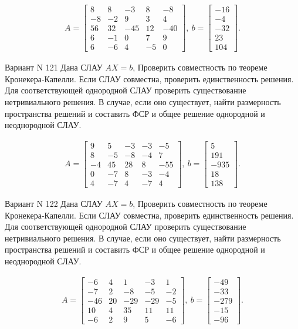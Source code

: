 \documentclass[11pt]{report}
\begin{document}
\begin{align*}
 A = \left[\begin{matrix}8 & 8 & -3 & 8 & -8\\-8 & -2 & 9 & 3 & 4\\56 & 32 & -45 & 12 & -40\\6 & -1 & 0 & 7 & 9\\6 & -6 & 4 & -5 & 0\end{matrix}\right],
\ b = \left[\begin{matrix}-16\\-4\\-32\\23\\104\end{matrix}\right]. 
 \end{align*}

Вариант N 121
Дана СЛАУ $AX = b$,
Проверить совместность по теореме Кронекера-Капелли. Если СЛАУ совместна, проверить единственность решения.
Для соответствующей однородной СЛАУ проверить существование нетривиального решения. В случае, если оно существует,
найти размерность пространства решений и составить ФСР и общее решение однородной  и неоднородной СЛАУ.


\begin{align*}
 A = \left[\begin{matrix}9 & 5 & -3 & -3 & -5\\8 & -5 & -8 & -4 & 7\\-4 & 45 & 28 & 8 & -55\\0 & -7 & 8 & -3 & -4\\4 & -7 & 4 & -7 & 4\end{matrix}\right],
\ b = \left[\begin{matrix}5\\191\\-935\\18\\138\end{matrix}\right]. 
 \end{align*}

Вариант N 122
Дана СЛАУ $AX = b$,
Проверить совместность по теореме Кронекера-Капелли. Если СЛАУ совместна, проверить единственность решения.
Для соответствующей однородной СЛАУ проверить существование нетривиального решения. В случае, если оно существует,
найти размерность пространства решений и составить ФСР и общее решение однородной  и неоднородной СЛАУ.


\begin{align*}
 A = \left[\begin{matrix}-6 & 4 & 1 & -3 & 1\\-7 & 2 & -8 & -5 & -2\\-46 & 20 & -29 & -29 & -5\\10 & 4 & 35 & 11 & 11\\-6 & 2 & 9 & 5 & -6\end{matrix}\right],
\ b = \left[\begin{matrix}-49\\-33\\-279\\-15\\-96\end{matrix}\right]. 
 \end{align*}
\end{document}
